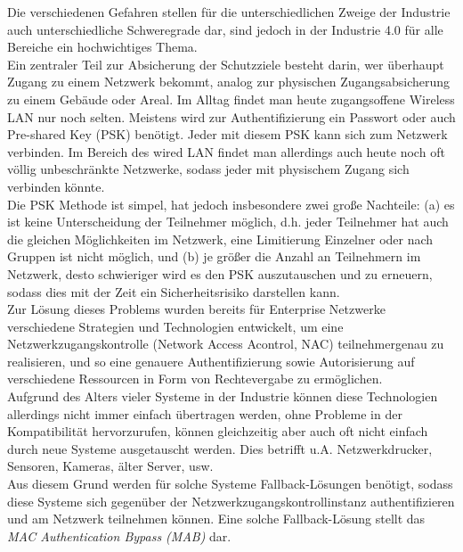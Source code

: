 \documentclass[conference]{IEEEtran}
\begin{document}
\vspace{.5em}

Die verschiedenen Gefahren stellen für die unterschiedlichen Zweige der Industrie auch unterschiedliche Schweregrade dar, sind jedoch in der Industrie 4.0 für alle Bereiche ein hochwichtiges Thema.\\

Ein zentraler Teil zur Absicherung der Schutzziele besteht darin, wer überhaupt Zugang zu einem Netzwerk bekommt, analog zur physischen Zugangsabsicherung zu einem Gebäude oder Areal. Im Alltag findet man heute zugangsoffene Wireless LAN nur noch selten. Meistens wird zur Authentifizierung ein Passwort oder auch Pre-shared Key (PSK) benötigt. Jeder mit diesem PSK kann sich zum Netzwerk verbinden. Im Bereich des wired LAN findet man allerdings auch heute noch oft völlig unbeschränkte Netzwerke, sodass jeder mit physischem Zugang sich verbinden könnte.\\

Die PSK Methode ist simpel, hat jedoch insbesondere zwei große Nachteile:
(a) es ist keine Unterscheidung der Teilnehmer möglich, d.h. jeder Teilnehmer hat auch die gleichen Möglichkeiten im Netzwerk, eine Limitierung Einzelner oder nach Gruppen ist nicht möglich, und
(b) je größer die Anzahl an Teilnehmern im Netzwerk, desto schwieriger wird es den PSK auszutauschen und zu erneuern, sodass dies mit der Zeit ein Sicherheitsrisiko darstellen kann.\\

Zur Lösung dieses Problems wurden bereits für Enterprise Netzwerke verschiedene Strategien und Technologien entwickelt, um eine Netzwerkzugangskontrolle (Network Access Acontrol, NAC) teilnehmergenau zu realisieren, und so eine genauere Authentifizierung sowie Autorisierung auf verschiedene Ressourcen in Form von Rechtevergabe zu ermöglichen.\\

Aufgrund des Alters vieler Systeme in der Industrie können diese Technologien allerdings nicht immer einfach übertragen werden, ohne Probleme in der Kompatibilität hervorzurufen, können gleichzeitig aber auch oft nicht einfach durch neue Systeme ausgetauscht werden. Dies betrifft u.A. Netzwerkdrucker, Sensoren, Kameras, älter Server, usw.\\

Aus diesem Grund werden für solche Systeme Fallback-Lösungen benötigt, sodass diese Systeme sich gegenüber der Netzwerkzugangskontrollinstanz authentifizieren und am Netzwerk teilnehmen können. Eine solche Fallback-Lösung stellt das \emph{MAC Authentication Bypass (MAB)} dar.
\end{document}
